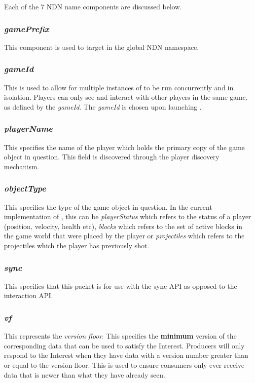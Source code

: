 Each of the 7 NDN name components are discussed below.

\subsubsection{\textit{gamePrefix}}
This component is used to target \game{} in the global NDN namespace.

\subsubsection{\textit{gameId}}
This is used to allow for multiple instances of \game{} to be run concurrently and in isolation. Players can only see and interact with other players in the same game, as defined by the \textit{gameId}. The \textit{gameId} is chosen upon launching \game{}.

\subsubsection{\textit{playerName}}
This specifies the name of the player which holds the primary copy of the game object in question. This field is discovered through the player discovery mechanism.

\subsubsection{\textit{objectType}}
This specifies the type of the game object in question. In the current implementation of \game{}, this can be \textit{playerStatus} which refers to the status of a player (position, velocity, health etc), \textit{blocks} which refers to the set of active blocks in the game world that were placed by the player or \textit{projectiles} which refers to the projectiles which the player has previously shot.

\subsubsection{\textit{sync}}
This specifies that this packet is for use with the sync API as opposed to the interaction API.

\subsubsection{\textit{vf}}
This represents the \textit{version floor}. This specifies the \textbf{minimum} version of the corresponding data that can be used to satisfy the Interest. Producers will only respond to the Interest when they have data with a version number greater than or equal to the version floor. This is used to ensure consumers only ever receive data that is newer than what they have already seen.

